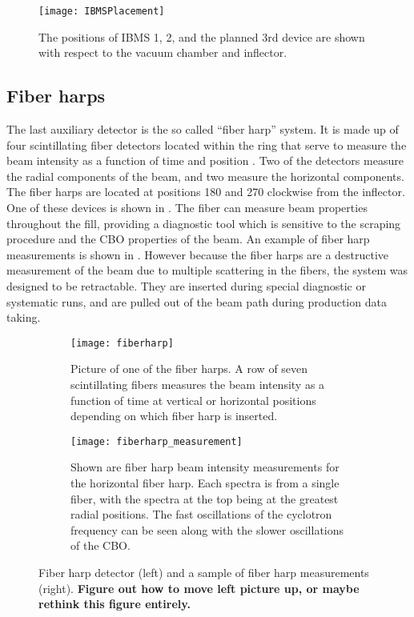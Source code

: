 \begin{figure}[]
    \centering
    \texttt{[image: IBMSPlacement]}
    \caption[IBMS Positions]{The positions of IBMS 1, 2, and the planned 3rd device are shown with respect to the vacuum chamber and inflector.}   
    \label{fig:IBMSPlacement}
\end{figure}



\subsection{Fiber harps}
\label{sec:FiberHarps}

The last auxiliary detector is the so called ``fiber harp'' system. It is made up of four scintillating fiber detectors located within the ring that serve to measure the beam intensity as a function of time and position \cite{fiberharp}. Two of the detectors measure the radial components of the beam, and two measure the horizontal components. The fiber harps are located at positions 180\textdegree{} and 270\textdegree{} clockwise from the inflector. One of these devices is shown in . The fiber can measure beam properties throughout the fill, providing a diagnostic tool which is sensitive to the scraping procedure and the CBO properties of the beam. An example of fiber harp measurements is shown in . However because the fiber harps are a destructive measurement of the beam due to multiple scattering in the fibers, the system was designed to be retractable. They are inserted during special diagnostic or systematic runs, and are pulled out of the beam path during production data taking.


\begin{figure}[]
\centering
    \begin{subfigure}[t]{0.45\textwidth}
        \centering
        \texttt{[image: fiberharp]}
        \caption{Picture of one of the fiber harps. A row of seven scintillating fibers measures the beam intensity as a function of time at vertical or horizontal positions depending on which fiber harp is inserted.}
    \label{fig:fiberharp}
    \end{subfigure}%
    \hspace{10mm}
    \begin{subfigure}[t]{0.45\textwidth}
        \centering
        \texttt{[image: fiberharp\_measurement]}
        \caption{Shown are fiber harp beam intensity measurements for the horizontal fiber harp. Each spectra is from a single fiber, with the spectra at the top being at the greatest radial positions. The fast oscillations of the cyclotron frequency can be seen along with the slower oscillations of the CBO.}
    \label{fig:fiberharp_measurement}
    \end{subfigure}
\caption[Fiber harp and measurement]{Fiber harp detector (left) and a sample of fiber harp measurements (right). \bf{Figure out how to move left picture up, or maybe rethink this figure entirely.}}
\label{fig:fiberharppics}
\end{figure}





